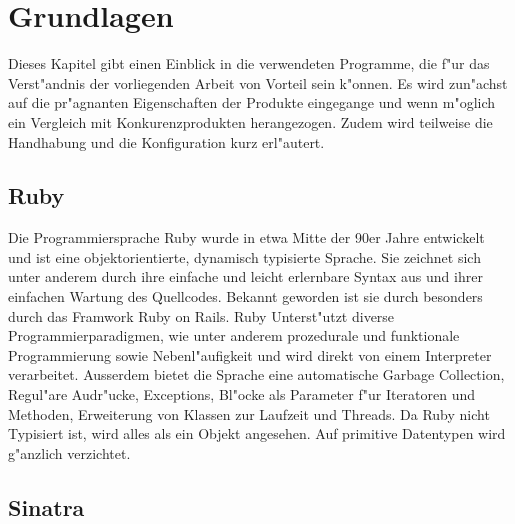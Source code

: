 \chapter{Grundlagen}
Dieses Kapitel gibt einen Einblick in die verwendeten Programme, die f"ur das Verst"andnis der vorliegenden Arbeit von Vorteil sein k"onnen.
Es wird zun"achst auf die pr"agnanten Eigenschaften der Produkte eingegange und wenn m"oglich ein Vergleich mit Konkurenzprodukten herangezogen.
Zudem wird teilweise die Handhabung und die Konfiguration kurz erl"autert.

\section{Ruby}
Die Programmiersprache Ruby wurde in etwa Mitte der 90er Jahre entwickelt und ist eine objektorientierte, dynamisch typisierte Sprache.
Sie zeichnet sich unter anderem durch ihre einfache und leicht erlernbare Syntax aus und ihrer einfachen Wartung des Quellcodes.
Bekannt geworden ist sie durch besonders durch das Framwork Ruby on Rails.\newline
Ruby Unterst"utzt diverse Programmierparadigmen, wie unter anderem prozedurale und funktionale Programmierung sowie Nebenl"aufigkeit und wird direkt von einem Interpreter verarbeitet. Ausserdem bietet die Sprache eine automatische Garbage Collection, Regul"are Audr"ucke, Exceptions, Bl"ocke als Parameter f"ur Iteratoren und Methoden, Erweiterung von Klassen zur Laufzeit und Threads.\newline 
Da Ruby nicht Typisiert ist, wird alles als ein Objekt angesehen. Auf primitive Datentypen wird g"anzlich verzichtet.

\section{Sinatra}